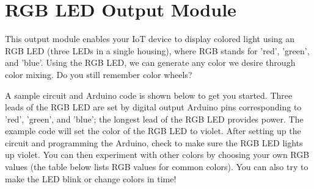 
\clearpage
\section{RGB LED Output Module}
\label{sec-output-rgb}

This output module enables your IoT device to display colored light
using an RGB LED (three LEDs in a single housing), where RGB stands for
'red', 'green', and 'blue'. Using the RGB LED, we can generate any color
we desire through color mixing. Do you still remember color wheels?

A sample circuit and Arduino code is shown below to get you started.
Three leads of the RGB LED are set by digital output Arduino pins
corresponding to 'red', 'green', and 'blue'; the longest lead of the RGB
LED provides power. The example code will set the color of the RGB LED
to violet. After setting up the circuit and programming the Arduino,
check to make sure the RGB LED lights up violet. You can then experiment
with other colors by choosing your own RGB values (the table below lists
RGB values for common colors). You can also try to make the LED blink or
change colors in time!

